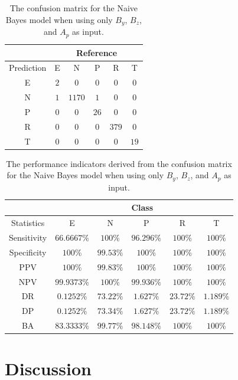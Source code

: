 \documentclass[preprint,12pt]{elsarticle}
\begin{document}
\begin{table}[!ht]
	\centering
	\begin{tabular}{|c|c|c|c|c|c|}
		\hline
		 & \multicolumn{5}{|c|}{Reference} \\ \hline
		 Prediction & E & N & P & R & T \\ \hline
		 E & $2$ & $0$ & $0$ & $0$ & $0$ \\ \hline
		 N & $1$ & $1170$ & $1$ & $0$ & $0$ \\ \hline
		 P & $0$ & $0$ & $26$ & $0$ & $0$ \\ \hline
		 R & $0$ & $0$ & $0$ & $379$ & $0$ \\ \hline
		 T & $0$ & $0$ & $0$ & $0$ & $19$ \\ \hline
	\end{tabular}
	\caption{The confusion matrix for the Naive Bayes model when using only $B_{y}$, $B_{z}$, and $A_{p}$ as input.}
	\label{tab:cm:yzap:nb}
\end{table}

\begin{table}[!ht]
	\centering
	\begin{tabular}{|c|c|c|c|c|c|}
		\hline
		 & \multicolumn{5}{c|}{Class} \\ \hline
		Statistics & E & N & P & R & T \\ \hline
		Sensitivity & $66.6667\%$ & $100\%$ & $96.296\%$ & $100\%$ & $100\%$ \\ \hline
		Specificity & $100\%$ & $99.53\%$ & $100\%$ & $100\%$ & $100\%$ \\ \hline
		PPV & $100\%$ & $99.83\%$ & $100\%$ & $100\%$ & $100\%$ \\ \hline
		NPV & $99.9373\%$ & $100\%$ & $99.936\%$ & $100\%$ & $100\%$ \\ \hline
		DR & $0.1252\%$ & $73.22\%$ & $1.627\%$ & $23.72\%$ & $1.189\%$ \\ \hline
		DP & $0.1252\%$ & $73.34\%$ & $1.627\%$ & $23.72\%$ & $1.189\%$ \\ \hline
		BA & $83.3333\%$ & $99.77\%$ & $98.148\%$ & $100\%$ & $100\%$ \\ \hline
	\end{tabular}
	\caption{The performance indicators derived from the confusion matrix for the Naive Bayes model when using only $B_{y}$, $B_{z}$, and $A_{p}$ as input.}
	\label{tab:cs:reverse:yzap:nb}
\end{table}

\section{Discussion}
\end{document}
